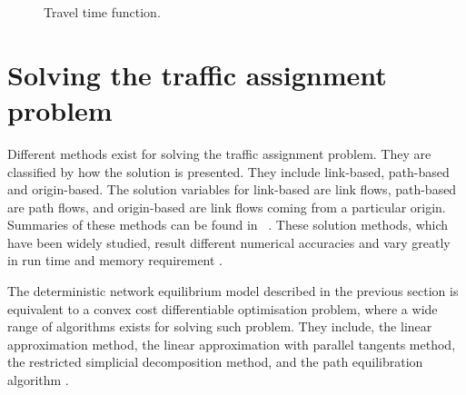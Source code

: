 \begin{figure}[!ht]
    \centering
    \caption{Travel time function.}
    \label{fig:flowfunction}
\end{figure}

\section{Solving the traffic assignment problem}

Different methods exist for solving the traffic assignment problem.
They are classified by how the solution is presented.
They include link-based, path-based and origin-based.
The solution variables for link-based are link flows,
path-based are path flows,
and origin-based are link flows coming from a particular origin.
Summaries of these methods can be found in ~\citet{Zhou2010}.
These solution methods, which have been widely studied,
result different numerical accuracies and vary greatly in run time and memory requirement \citep{Olga2013}.

The deterministic network equilibrium model described in the previous section is equivalent to a convex cost differentiable optimisation problem,
where a wide range of algorithms exists for solving such problem.
They include, the linear approximation method,
the linear approximation with parallel tangents method,
the restricted simplicial decomposition method,
and the path equilibration algorithm \citep{Florian}.

